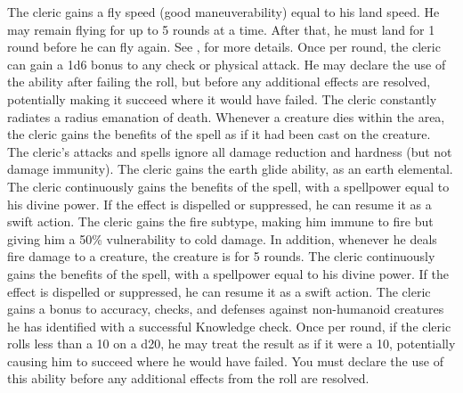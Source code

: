             The cleric gains a fly speed (good maneuverability) equal to his land speed.
            He may remain flying for up to 5 rounds at a time.
            After that, he must land for 1 round before he can fly again.
            See , for more details.
            Once per round, the cleric can gain a \plus1d6 bonus to any check or physical attack.
            He may declare the use of the ability after failing the roll, but before any additional effects are resolved, potentially making it succeed where it would have failed.
            The cleric constantly radiates a \areamed radius emanation of death.
            Whenever a creature dies within the area, the cleric gains the benefits of the  spell as if it had been cast on the creature.
            The cleric's attacks and spells ignore all damage reduction and hardness (but not damage immunity).
            The cleric gains the earth glide ability, as an earth elemental.
             The cleric continuously gains the benefits of the 
            spell, with a spellpower equal to his divine power.
            If the effect is dispelled or suppressed, he can resume it as a swift action.
            The cleric gains the fire subtype, making him immune to fire but giving him a 50\% vulnerability to cold damage.
            In addition, whenever he deals fire damage to a creature, the creature is \ignited for 5 rounds.
             The cleric continuously gains the benefits of the 
            spell, with a spellpower equal to his divine power.
            If the effect is dispelled or suppressed, he can resume it as a swift action.
            The cleric gains a  bonus to accuracy, checks, and defenses against non-humanoid creatures he has identified with a successful Knowledge check.
            Once per round, if the cleric rolls less than a 10 on a d20, he may treat the result as if it were a 10, potentially causing him to succeed where he would have failed.
            You must declare the use of this ability before any additional effects from the roll are resolved.
